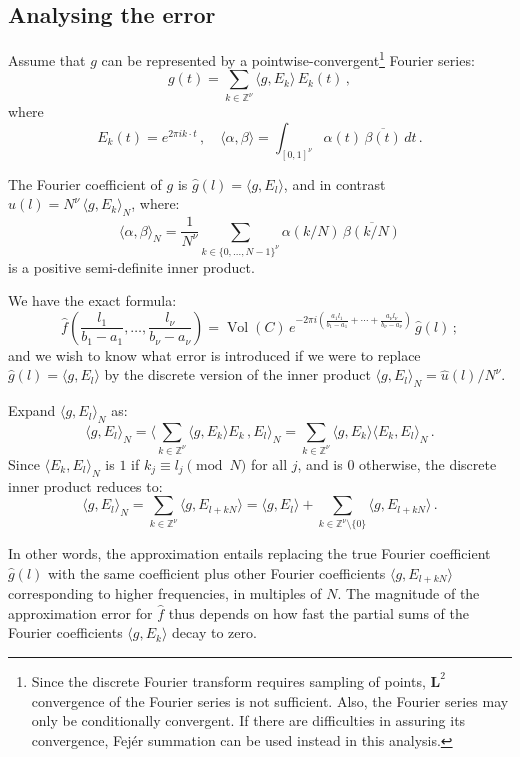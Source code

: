 \documentclass[12pt]{article}
\newcommand{\intset}{\mathbb{Z}}
\providecommand{\ip}[2]{\langle {#1}, {#2} \rangle}
\newcommand{\Le}{\mathbf{L}}
\providecommand{\ipB}[2]{\biggl\langle {#1}\,, {#2} \biggr\rangle}
\DeclareMathOperator{\Vol}{Vol}
\providecommand{\conjug}[1]{\overline{#1}}
\begin{document}
\subsection*{Analysing the error}

Assume that $g$ can be represented by a pointwise-convergent\footnote{
Since the discrete Fourier transform requires sampling of points, $\Le^2$
convergence of the Fourier series is not sufficient. Also, the Fourier series
may only be conditionally convergent.  If there are difficulties in assuring
its convergence, Fej\'er summation can be
used instead in this analysis.}
 Fourier series:
\[
g(t) = \sum_{k \in \intset^\nu} \ip{g}{E_k} \, E_k(t)\,, 
\]
where
\[
E_k(t) = e^{2\pi i k \cdot t}\,, \quad
\ip{\alpha}{\beta} = \int_{[0,1]^\nu} \alpha(t) \, \conjug{\beta(t)} \, dt\,.
\]

The Fourier coefficient of $g$ is 
$\hat{g}(l) = \ip{g}{E_l}$, and in contrast 
$\hat{u}(l) = N^\nu \, \ip{g}{E_k}_N$, where:
\[
\ip{\alpha}{\beta}_N = \frac{1}{N^\nu} 
\sum_{k \in \{0, \dotsc, N-1\}^\nu} \alpha(k/N) \, \conjug{\beta(k/N)}
\] 
is a positive semi-definite inner product.

We have the exact formula:
\[
\hat{f}\left( \frac{l_1}{b_1 - a_1}, \dotsc, \frac{l_\nu}{b_\nu - a_\nu} \right)
= \Vol(C) \, e^{-2\pi i \left( \frac{a_1 l_1}{b_1 - a_1} + \dotsb + \frac{a_\nu l_\nu}{b_\nu - a_\nu} \right)} \, \hat{g}(l)\,;
\]
and we wish to know what error is introduced
if we were to replace $\hat{g}(l) = \ip{g}{E_l}$
by the discrete version of the inner product $\ip{g}{E_l}_N = \hat{u}(l)/N^\nu$.

Expand $\ip{g}{E_l}_N$ as:
\[
\ip{g}{E_l}_N = \ipB{ 
\sum_{k \in \intset^\nu} \ip{g}{E_k} E_k}{E_l}_N
= \sum_{k \in \intset^\nu} \ip{g}{E_k} \ip{E_k}{E_l}_N \,.
\]
Since $\ip{E_k}{E_l}_N$ is $1$ if $k_j \equiv l_j \pmod N$ for all $j$,
and is $0$ otherwise,
the discrete inner product reduces to:
\[
\ip{g}{E_l}_N 
= \sum_{k \in \intset^\nu} \ip{g}{E_{l + kN}} 
= \ip{g}{E_l} + \sum_{k \in \intset^\nu \setminus \{0\} } \ip{g}{E_{l + kN}} \,.
\]

In other words, the approximation entails replacing
the true Fourier coefficient $\hat{g}(l)$
with the same coefficient
plus other Fourier coefficients $\ip{g}{E_{l+kN}}$
corresponding to higher
frequencies, in multiples of $N$.
The magnitude of the approximation error
for $\hat{f}$
thus depends on how fast the partial sums
of the Fourier coefficients $\ip{g}{E_k}$ decay to zero.

\end{document}
